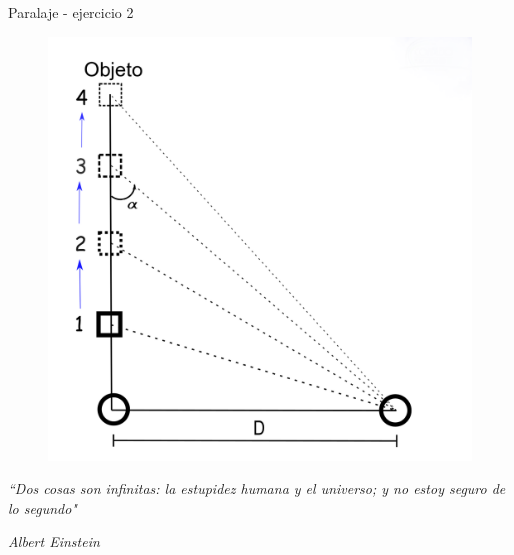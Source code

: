 \documentclass{beamer}
\begin{document}
\begin{frame}{Paralaje - ejercicio 2}
  \begin{figure}
   \centering
   \includegraphics[scale=0.23]{Imagenes/Paralaje_03}
  \end{figure}
\end{frame}

\begin{frame}
\begin{center}
\Huge 
\textit{``Dos cosas son infinitas: la estupidez humana y el universo; y no estoy seguro de lo segundo"}
\end{center}
\begin{flushright}
\small
\textit{Albert Einstein}
\end{flushright}
\end{frame}
\end{document}
